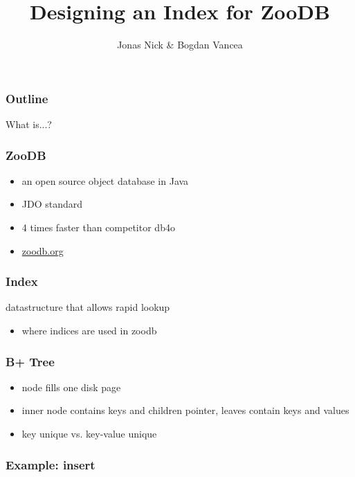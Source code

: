 \documentclass{beamer}
\title{Designing an Index for ZooDB}
\author{Jonas Nick \& Bogdan Vancea}
\begin{document}
  \frame{\titlepage}
  \begin{frame}
    \frametitle{Outline}
    \tableofcontents[hideallsubsections]
  \end{frame}

  \begin{section}{What is...?}
    \begin{frame}
      \frametitle{ZooDB}
      \begin{itemize}
        \item an open source object database in Java
        \item JDO standard
        \item 4 times faster than competitor db4o
        \item \url{zoodb.org}
      \end{itemize}

    \end{frame}
    \begin{frame}
      \frametitle{Index}
      \begin{block}{}
        datastructure that allows rapid lookup
      \end{block}
      \begin{itemize}
        \item where indices are used in zoodb
      \end{itemize}
    \end{frame}
    \begin{frame}
      \frametitle{B+ Tree}
      \begin{itemize}
        \item node fills one disk page
        \item inner node contains keys and children pointer, leaves contain keys and values
        \item key unique vs. key-value unique
      \end{itemize}
    \end{frame}
    \begin{frame}
      \frametitle{Example: insert}
    \end{frame}
  \end{section}
\end{document}
